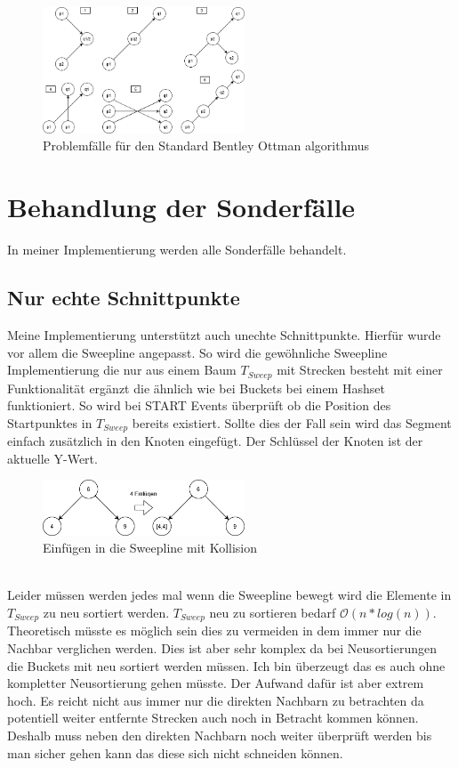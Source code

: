 \documentclass[conference]{IEEEtran}
\begin{document}
	\begin{figure}[h]
		\begin{center}
			\includegraphics[width=6cm]{ProblemFaelle.png}
			\caption{Problemfälle für den Standard Bentley Ottman algorithmus}
			\label{figure_3}
		\end{center}
	\end{figure}



	\section{Behandlung der Sonderfälle}
	In meiner Implementierung werden alle Sonderfälle behandelt.
	\subsection{Nur echte Schnittpunkte}
	Meine Implementierung unterstützt auch unechte Schnittpunkte. Hierfür wurde vor allem die Sweepline angepasst. So wird die gewöhnliche Sweepline Implementierung die nur aus einem Baum $T_{Sweep}$ mit Strecken besteht mit einer Funktionalität ergänzt die ähnlich wie bei Buckets bei einem Hashset funktioniert. So wird bei START Events überprüft ob die Position des Startpunktes in $T_{Sweep}$ bereits existiert. Sollte dies der Fall sein wird das Segment einfach zusätzlich in den Knoten eingefügt. Der Schlüssel der Knoten ist der aktuelle Y-Wert.\\
	\begin{figure}[h!]
		\begin{center}
			\includegraphics[width=6cm]{BaumKollision.png}
			\caption{Einfügen in die Sweepline mit Kollision}
			\label{figure_collision}
		\end{center}
	\end{figure}\\
	Leider müssen werden jedes mal wenn die Sweepline bewegt wird die Elemente in $T_{Sweep}$ zu neu sortiert werden. $T_{Sweep}$ neu zu sortieren bedarf $\mathcal{O}(n*log(n))$. Theoretisch müsste es möglich sein dies zu vermeiden in dem immer nur die Nachbar verglichen werden. Dies ist aber sehr komplex da bei Neusortierungen die Buckets mit neu sortiert werden müssen. Ich bin überzeugt das es auch ohne kompletter Neusortierung gehen müsste. Der Aufwand dafür ist aber extrem hoch. Es reicht nicht aus immer nur die direkten Nachbarn zu betrachten da potentiell weiter entfernte Strecken auch noch in Betracht kommen können. Deshalb muss neben den direkten Nachbarn noch weiter überprüft werden bis man sicher gehen kann das diese sich nicht schneiden können.
	
\end{document}
